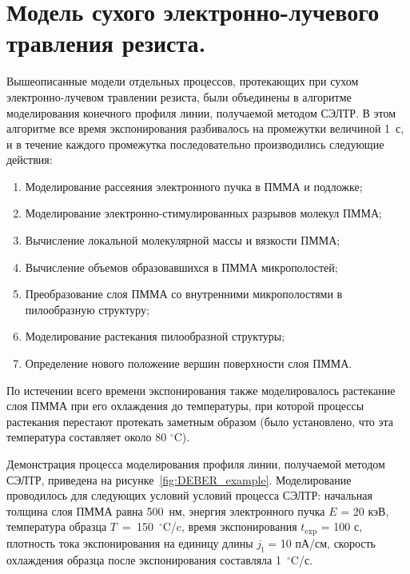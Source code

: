 \section{Модель сухого электронно-лучевого травления резиста.}

Вышеописанные модели отдельных процессов, протекающих при сухом электронно-лучевом травлении резиста, были объединены в алгоритме моделирования конечного профиля линии, получаемой методом СЭЛТР. В этом алгоритме все время экспонирования разбивалось на промежутки величиной 1~с, и в течение каждого промежутка последовательно производились следующие действия:

\begin{enumerate}
	\item Моделирование рассеяния электронного пучка в ПММА и подложке;
	\item Моделирование электронно-стимулированных разрывов молекул \linebreak ПММА;
	\item Вычисление локальной молекулярной массы и вязкости ПММА;
	\item Вычисление объемов образовавшихся в ПММА микрополостей;
	\item Преобразование слоя ПММА со внутренними микрополостями в пилообразную структуру;
	\item Моделирование растекания пилообразной структуры;
	\item Определение нового положение вершин поверхности слоя ПММА.
\end{enumerate}

По истечении всего времени экспонирования также моделировалось растекание слоя ПММА при его охлаждения до температуры, при которой процессы растекания перестают протекать заметным образом (было установлено, что эта температура составляет около 80 $^\circ$C).

Демонстрация процесса моделирования профиля линии, получаемой методом СЭЛТР, приведена на рисунке~\ref{fig:DEBER_example}. Моделирование проводилось для следующих условий условий процесса СЭЛТР: начальная толщина слоя ПММА равна 500~нм, энергия электронного пучка $E$ = 20 кэВ, температура образца $T$~=~150~$^{\circ}$C/c, время экспонирования $t_\mathrm{exp}$ = 100 с, плотность тока экспонирования на единицу длины $j_\mathrm{l}$ = 10 пА/см, скорость охлаждения образца после экспонирования составляла 1~$^{\circ}$C/с.

